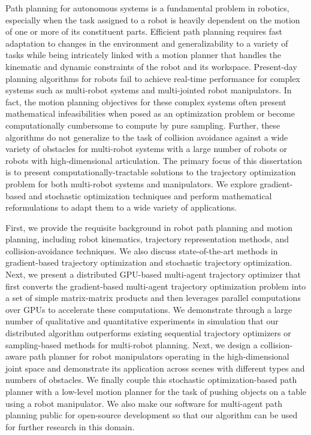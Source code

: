 Path planning for autonomous systems is a fundamental problem in robotics, especially when the task assigned to a robot is heavily dependent on the motion of one or more of its constituent parts. Efficient path planning requires fast adaptation to changes in the environment and generalizability to a variety of tasks while being intricately linked with a motion planner that handles the kinematic and dynamic constraints of the robot and its workspace. Present-day planning algorithms for robots fail to achieve real-time performance for complex systems such as multi-robot systems and multi-jointed robot manipulators. In fact, the motion planning objectives for these complex systems often present mathematical infeasibilities when posed as an optimization problem or become computationally cumbersome to compute by pure sampling. Further, these algorithms do not generalize to the task of collision avoidance against a wide variety of obstacles for multi-robot systems with a large number of robots or robots with high-dimensional articulation. The primary focus of this dissertation is to present computationally-tractable solutions to the trajectory optimization problem for both multi-robot systems and manipulators. We explore gradient-based and stochastic optimization techniques and perform mathematical reformulations to adapt them to a wide variety of applications.

First, we provide the requisite background in robot path planning and motion planning, including robot kinematics, trajectory representation methods, and collision-avoidance techniques. We also discuss state-of-the-art methods in gradient-based trajectory optimization and stochastic trajectory optimization. Next, we present a distributed GPU-based multi-agent trajectory optimizer that first converts the gradient-based multi-agent trajectory optimization problem into a set of simple matrix-matrix products and then leverages parallel computations over GPUs to accelerate these computations. We demonstrate through a large number of qualitative and quantitative experiments in simulation that our distributed algorithm outperforms existing sequential trajectory optimizers or sampling-based methods for multi-robot planning. Next, we design a collision-aware path planner for robot manipulators operating in the high-dimensional joint space and demonstrate its application across scenes with different types and numbers of obstacles. We finally couple this stochastic optimization-based path planner with a low-level motion planner for the task of pushing objects on a table using a robot manipulator. We also make our software for multi-agent path planning public for open-source development so that our algorithm can be used for further research in this domain.
